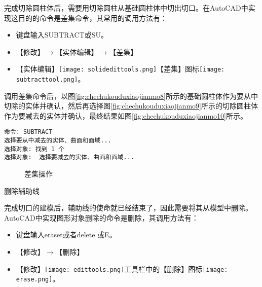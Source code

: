 \begin{procedure}
完成切除圆柱体后，需要用切除圆柱从基础圆柱体中切出切口。在AutoCAD中实现这目的的命令是差集命令，其常用的调用方法有：

\begin{itemize}
\item 键盘输入SUBTRACT或SU。
\item 【修改】$\rightarrow$【实体编辑】$\rightarrow$【差集】
\item 【实体编辑】\texttt{[image: solidedittools.png]}【差集】图标\texttt{[image: subtracttool.png]}。
\end{itemize}

调用差集命令后，以图\ref{fig:chechukouduxiaojianmo8}所示的基础圆柱体作为要从中切除的实体并确认，然后再选择图\ref{fig:chechukouduxiaojianmo9}所示的切除圆柱体作为要减去的实体并确认，最终结果如图\ref{fig:chechukouduxiaojianmo10}所示。

\begin{lstlisting}
命令: SUBTRACT
选择要从中减去的实体、曲面和面域...
选择对象: 找到 1 个
选择对象:  选择要减去的实体、曲面和面域...
\end{lstlisting}

\begin{figure}[htbp]%
\centering
{}\hspace{10pt}
\hspace{10pt}
\caption{差集操作}
\end{figure}

\item 删除辅助线

完成切口的建模后，辅助线的使命就已经结束了，因此需要将其从模型中删除。AutoCAD中实现图形对象删除的命令是删除，其调用方法有：

\begin{itemize}
\item 键盘输入eraset或者delete 或E。
\item 【修改】$\rightarrow$【删除】
\item 【修改】\texttt{[image: edittools.png]}工具栏中的【删除】图标\texttt{[image: erase.png]}。
\end{itemize}


\end{procedure}
